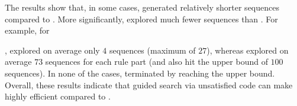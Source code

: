 The results show that, in some cases, \tool{} generated relatively shorter
sequences compared to \exhaust{}. More significantly, \tool{} explored much
fewer sequences than \exhaust{}. For example, for \subject{Cebu-pacific},
\tool{} explored on average only $4$ sequences (maximum of $27$), whereas
\exhaust{} explored on average $73$ sequences for each rule part (and also hit
the upper bound of $100$ sequences). In none of the cases, \tool{} terminated by
reaching the upper bound. Overall, these results indicate that guided search via
unsatisfied code can make \tool{} highly efficient compared to \exhaust{}.
